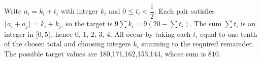 Write $ a_i=k_i+t_i $ with integer $ k_i $ and $ 0\le t_i<\dfrac{1}{2}$. Each pair satisfies $\lfloor a_i+a_j\rfloor=k_i+k_j $, so the target is $ 9\sum k_i=9(20-\sum t_i)$. The sum $\sum t_i $ is an integer in $[0,5)$, hence 0, 1, 2, 3, 4. All occur by taking each $ t_i $ equal to one tenth of the chosen total and choosing integers $ k_i $ summing to the required remainder. The possible target values are 180,171,162,153,144, whose sum is $\boxed{810}$.
